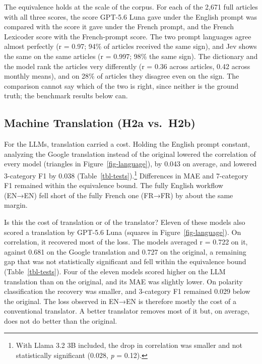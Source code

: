 \documentclass[
  man,
  floatsintext,
  longtable,
  nolmodern,
  notxfonts,
  notimes,
  colorlinks=true,linkcolor=blue,citecolor=blue,urlcolor=blue]{apa7}
\begin{document}
The equivalence holds at the scale of the corpus. For each of the 2,671
full articles with all three scores, the score GPT-5.6 Luna gave under
the English prompt was compared with the score it gave under the French
prompt, and the French Lexicoder score with the French-prompt score. The
two prompt languages agree almost perfectly (r = 0.97; 94\% of articles
received the same sign), and Jev shows the same on the same articles (r
= 0.997; 98\% the same sign). The dictionary and the model rank the
articles very differently (r = 0.36 across articles, 0.42 across monthly
means), and on 28\% of articles they disagree even on the sign. The
comparison cannot say which of the two is right, since neither is the
ground truth; the benchmark results below can.

\subsection{Machine Translation (H2a
vs.~H2b)}\label{machine-translation-h2a-vs.-h2b}

For the LLMs, translation carried a cost. Holding the English prompt
constant, analyzing the Google translation instead of the original
lowered the correlation of every model (triangles in
Figure~\ref{fig-language}), by 0.043 on average, and lowered 3-category
F1 by 0.038 (Table~\ref{tbl-tests}).\footnote{With Llama 3.2 3B
  included, the drop in correlation was smaller and not statistically
  significant (0.028, \emph{p} = 0.12).} Differences in MAE and
7-category F1 remained within the equivalence bound. The fully English
workflow (EN→EN) fell short of the fully French one (FR→FR) by about the
same margin.

Is this the cost of translation or of the translator? Eleven of these
models also scored a translation by GPT-5.6 Luna (squares in
Figure~\ref{fig-language}). On correlation, it recovered most of the
loss. The models averaged r = 0.722 on it, against 0.681 on the Google
translation and 0.727 on the original, a remaining gap that was not
statistically significant and fell within the equivalence bound
(Table~\ref{tbl-tests}). Four of the eleven models scored higher on the
LLM translation than on the original, and its MAE was slightly lower. On
polarity classification the recovery was smaller, and 3-category F1
remained 0.029 below the original. The loss observed in EN→EN is
therefore mostly the cost of a conventional translator. A better
translator removes most of it but, on average, does not do better than
the original.
\end{document}
